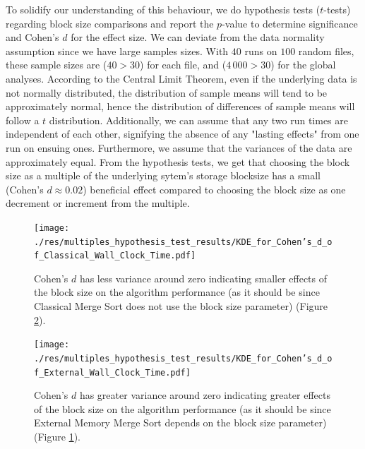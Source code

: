 \documentclass[twocolumn]{article}
\begin{document}
To solidify our understanding of this behaviour, we do hypothesis tests (\( t \)-tests) regarding block size comparisons and report the \( p \)-value to determine significance and Cohen's \( d \) for the effect size.
We can deviate from the data normality assumption since we have large samples sizes.
With \( 40 \) runs on \( 100 \) random files, these sample sizes are (\(40 > 30 \)) for each file, and (\(4\,000 > 30 \)) for the global analyses.
According to the Central Limit Theorem, even if the underlying data is not normally distributed, the distribution of sample means will tend to be approximately normal, hence the
distribution of differences of sample means will follow a \( t \) distribution.
Additionally, we can assume that any two run times are independent of each other, signifying the absence of any "lasting effects" from one run on ensuing ones.
Furthermore, we assume that the variances of the data are approximately equal. From the hypothesis tests, we get that choosing the block size as a multiple of the underlying sytem's storage blocksize
has a small (Cohen's \( d \approx 0.02 \)) beneficial effect compared to choosing the block size as one decrement or increment from the multiple.

\begin{figure}[htb]
    \begin{minipage}{0.475 \textwidth}
        \centering
        \texttt{[image: ./res/multiples\_hypothesis\_test\_results/KDE\_for\_Cohen's\_d\_of\_Classical\_Wall\_Clock\_Time.pdf]}
        \caption{Cohen's \(d\) has less variance around zero indicating smaller effects of the block size on the algorithm performance (as it should be since Classical Merge Sort does not use the block size parameter)
            (Figure \ref{fig:KDE_for_Cohen's_d_of_External_Wall_Clock_Time.pdf}).}
        \label{fig:KDE_for_Cohen's_d_of_Classical_Wall_Clock_Time.pdf}
    \end{minipage}
\end{figure}

\begin{figure}[htb]
    \begin{minipage}{0.475 \textwidth}
        \centering
        \texttt{[image: ./res/multiples\_hypothesis\_test\_results/KDE\_for\_Cohen's\_d\_of\_External\_Wall\_Clock\_Time.pdf]}
        \caption{Cohen's \(d\) has greater variance around zero indicating greater effects of the block size on the algorithm performance (as it should be since
            External Memory Merge Sort depends on the block size parameter)
            (Figure \ref{fig:KDE_for_Cohen's_d_of_Classical_Wall_Clock_Time.pdf}).}
        \label{fig:KDE_for_Cohen's_d_of_External_Wall_Clock_Time.pdf}
    \end{minipage}
\end{figure}
\end{document}
